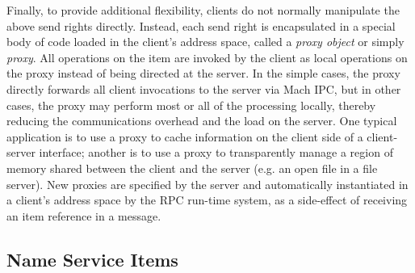 Finally, to provide additional flexibility, clients do not normally
manipulate the above send rights directly. Instead, each send right is
encapsulated in a special body of code loaded in the client's address
space, called a {\em proxy object} or simply {\em
proxy}\cite{SHAPIRO86}.  All operations on the item are invoked by the
client as local operations on the proxy instead of being directed at
the server.  In the simple cases, the proxy directly forwards all
client invocations to the server via Mach IPC, but in other cases, the
proxy may perform most or all of the processing locally, thereby
reducing the communications overhead and the load on the server. One
typical application is to use a proxy to cache information on the
client side of a client-server interface; another is to use a proxy to
transparently manage a region of memory shared between the client and
the server (e.g. an open file in a file server).  New proxies are
specified by the server and automatically instantiated in a client's
address space by the RPC run-time system, as a side-effect of
receiving an item reference in a message.

\subsection{Name Service Items}

